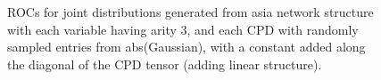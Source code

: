 \documentclass{article} %
\newlength{\subfigheight}
\begin{document}
\begin{figure}[h]
\centering
\caption{ROCs for joint distributions generated from asia network structure with each variable having arity 3, and each CPD with randomly sampled entries from abs(Gaussian), with a constant added along the diagonal of the CPD tensor (adding linear structure).}
\end{figure}
\end{document}
